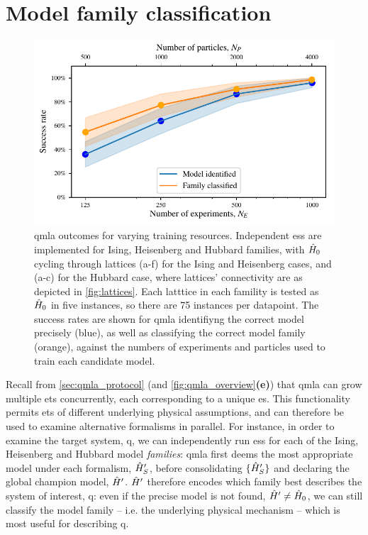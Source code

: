 \section{Model family classification}\label{sec:family_classification}
\begin{figure}[t]
    \begin{center}
        \includegraphics{theoretical_study/figures/model_family_search.pdf}
    \end{center}
    \caption[QMLA outcomes for varying training resources]{
        \gls{qmla} outcomes for varying training resources. 
        Independent \glspl{es} are implemented for Ising, Heisenberg and Hubbard families, 
            with $\hat{H}_0$ cycling through lattices (a-f) for the Ising and Heisenberg cases, 
            and (a-c) for the Hubbard case, where lattices' connectivity are as depicted in \cref{fig:lattices}.
        Each latttice in each famility is tested as $\hat{H}_0$ in five \glspl{instance}, so there are 75 \glspl{instance} per datapoint. 
        The success rates are shown for \gls{qmla} identifiyng the correct model precisely (blue),
            as well as classifying the correct model family (orange), 
            against the numbers of \glspl{experiment} and \glspl{particle} used to train each candidate model. 
        \figtableref
    }
    \label{fig:family_classification}
\end{figure}



Recall from \cref{sec:qmla_protocol} (and \cref{fig:qmla_overview}\textbf{(e)}) that \gls{qmla} 
    can grow multiple \glspl{et} concurrently, each corresponding to a unique \gls{es}. 
This functionality permits \glspl{et} of different underlying physical assumptions, 
    and can therefore be used to examine alternative formalisms in parallel.
For instance, in order to examine the target system, \gls{q}, 
    we can independently run \glspl{es} for each of the Ising, Heisenberg and Hubbard model \emph{families}:
    \gls{qmla} first deems the most appropriate model under each formalism, $\hat{H}^{\prime}_S$,
    before consolidating $\{\hat{H}^{\prime}_S\}$ and declaring the global \gls{champion model}, $\hat{H}^{\prime}$. 
$\hat{H}^{\prime}$ therefore encodes which family best describes the system of interest, \gls{q}:
    even if the precise model is not found, $\hat{H}^{\prime} \neq \hat{H}_0$, we can still classify the 
    model family -- i.e. the underlying physical mechanism -- which is most useful for describing \gls{q}. 
\par 

